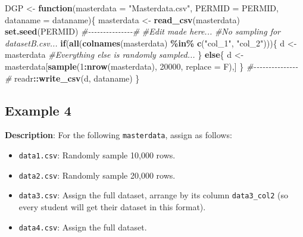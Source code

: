\documentclass[
  12pt,
]{book}
\newenvironment{Shaded}{\begin{snugshade}}{\end{snugshade}}
\newcommand{\AttributeTok}[1]{\textcolor[rgb]{0.13,0.29,0.53}{#1}}
\newcommand{\CommentTok}[1]{\textcolor[rgb]{0.56,0.35,0.01}{\textit{#1}}}
\newcommand{\ControlFlowTok}[1]{\textcolor[rgb]{0.13,0.29,0.53}{\textbf{#1}}}
\newcommand{\DecValTok}[1]{\textcolor[rgb]{0.00,0.00,0.81}{#1}}
\newcommand{\FunctionTok}[1]{\textcolor[rgb]{0.13,0.29,0.53}{\textbf{#1}}}
\newcommand{\NormalTok}[1]{#1}
\newcommand{\OtherTok}[1]{\textcolor[rgb]{0.56,0.35,0.01}{#1}}
\newcommand{\SpecialCharTok}[1]{\textcolor[rgb]{0.81,0.36,0.00}{\textbf{#1}}}
\newcommand{\StringTok}[1]{\textcolor[rgb]{0.31,0.60,0.02}{#1}}
\begin{document}
\begin{Shaded}
\begin{Highlighting}[]
\NormalTok{DGP }\OtherTok{\textless{}{-}} \ControlFlowTok{function}\NormalTok{(}\AttributeTok{masterdata =} \StringTok{"Masterdata.csv"}\NormalTok{, }\AttributeTok{PERMID =}\NormalTok{ PERMID, }\AttributeTok{dataname =}\NormalTok{ dataname)\{}
\NormalTok{  masterdata }\OtherTok{\textless{}{-}} \FunctionTok{read\_csv}\NormalTok{(masterdata)}
  \FunctionTok{set.seed}\NormalTok{(PERMID)}
  \CommentTok{\#{-}{-}{-}{-}{-}{-}{-}{-}{-}{-}{-}{-}{-}{-}{-}\#}
  \CommentTok{\#Edit made here... }
  \CommentTok{\#No sampling for datasetB.csv... }
  \ControlFlowTok{if}\NormalTok{(}\FunctionTok{all}\NormalTok{(}\FunctionTok{colnames}\NormalTok{(masterdata) }\SpecialCharTok{\%in\%} \FunctionTok{c}\NormalTok{(}\StringTok{"col\_1"}\NormalTok{, }\StringTok{"col\_2"}\NormalTok{)))\{}
\NormalTok{    d }\OtherTok{\textless{}{-}}\NormalTok{ masterdata}
  \CommentTok{\#Everything else is randomly sampled...}
\NormalTok{  \} }\ControlFlowTok{else}\NormalTok{\{}
\NormalTok{    d }\OtherTok{\textless{}{-}}\NormalTok{ masterdata[}\FunctionTok{sample}\NormalTok{(}\DecValTok{1}\SpecialCharTok{:}\FunctionTok{nrow}\NormalTok{(masterdata), }\DecValTok{20000}\NormalTok{, }\AttributeTok{replace =}\NormalTok{ F),]}
\NormalTok{  \}}
  \CommentTok{\#{-}{-}{-}{-}{-}{-}{-}{-}{-}{-}{-}{-}{-}{-}{-}\#}
\NormalTok{  readr}\SpecialCharTok{::}\FunctionTok{write\_csv}\NormalTok{(d, dataname)}
\NormalTok{\}}
\end{Highlighting}
\end{Shaded}

\subsection*{Example 4}\label{example-4-1}

\textbf{Description}: For the following \texttt{masterdata}, assign as follows:

\begin{itemize}
\item
  \texttt{data1.csv}: Randomly sample 10,000 rows.
\item
  \texttt{data2.csv}: Randomly sample 20,000 rows.
\item
  \texttt{data3.csv}: Assign the full dataset, arrange by its column \texttt{data3\_col2} (so every student will get their dataset in this format).
\item
  \texttt{data4.csv}: Assign the full dataset.
\end{itemize}
\end{document}
